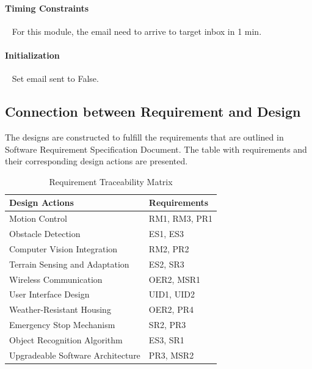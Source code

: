 \documentclass[12pt]{article}
\begin{document}
            \paragraph{Timing Constraints}
            ~\newline
            For this module, the email need to arrive to target inbox in 1 min. \\
            
            \paragraph{Initialization}
            ~\newline
            Set email sent to False. \\

    
    \subsection{Connection between Requirement and Design}
        The designs are constructed to fulfill the requirements that are outlined in Software Requirement Specification Document. The table with requirements and their corresponding design actions are presented.
        
        \begin{table}[H]
            \begin{tabular}{|p{}| p{}|}
                \hline    Design Actions                      &    Requirements                       \\
                \midrule
                \hline  Motion Control      &   RM1, RM3, PR1    \\
                \hline  Obstacle Detection    &   ES1, ES3\\
                \hline  Computer Vision Integration   &  RM2, PR2\\
                \hline  Terrain Sensing and Adaptation & ES2, SR3\\
                \hline  Wireless Communication &  OER2, MSR1  \\
                \hline  User Interface Design & UID1, UID2 \\
                \hline  Weather-Resistant Housing &  OER2, PR4\\
                \hline  Emergency Stop Mechanism  &  SR2, PR3\\
                \hline  Object Recognition Algorithm & ES3, SR1\\
                \hline  Upgradeable Software Architecture & PR3, MSR2\\
                \hline
                
            \end{tabular}
            \caption{Requirement Traceability Matrix}
        \end{table}
\end{document}
